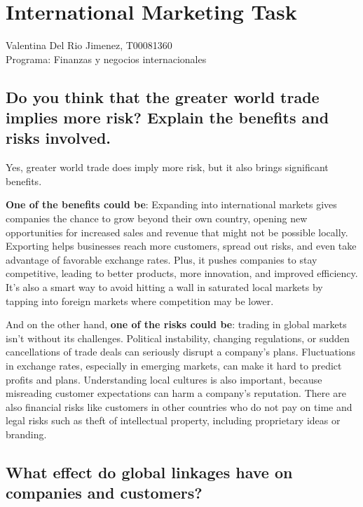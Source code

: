 \documentclass[letterpaper, 12pt]{report}
\begin{document}
\chapter*{International Marketing Task}

\noindent\makebox[\linewidth]{\rule{\textwidth}{0.4pt}}

\noindent
Valentina Del Rio Jimenez, T00081360 \\
Programa: Finanzas y negocios internacionales

\noindent\makebox[\linewidth]{\rule{\textwidth}{0.4pt}}

\nocite{*}

\section{Do you think that the greater world trade implies more risk? Explain the benefits and risks involved.}

Yes, greater world trade does imply more risk, but it also brings significant benefits.

\textbf{One of the benefits could be}: Expanding into international markets gives companies the chance to grow beyond their own country, opening new opportunities for increased sales and revenue that might not be possible locally. Exporting helps businesses reach more customers, spread out risks, and even take advantage of favorable exchange rates. Plus, it pushes companies to stay competitive, leading to better products, more innovation, and improved efficiency. It’s also a smart way to avoid hitting a wall in saturated local markets by tapping into foreign markets where competition may be lower. 

And on the other hand, \textbf{one of the risks could be}: trading in global markets isn’t without its challenges. Political instability, changing regulations, or sudden cancellations of trade deals can seriously disrupt a company’s plans. Fluctuations in exchange rates, especially in emerging markets, can make it hard to predict profits and plans. Understanding local cultures is also important, because misreading customer expectations can harm a company's reputation. There are also financial risks like customers in other countries who do not pay on time and legal risks such as theft of intellectual property, including proprietary ideas or branding.

\section{What effect do global linkages have on companies and customers?}
\end{document}
